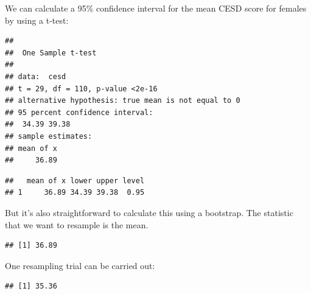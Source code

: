 We can calculate a 95\% confidence interval for the mean CESD 
score for females by using a t-test:
\begin{knitrout}
\color{fgcolor}\begin{kframe}
\begin{alltt}
\hlstd{(}\hlopt{~}  
\end{alltt}
\begin{verbatim}
## 
## 	One Sample t-test
## 
## data:  cesd
## t = 29, df = 110, p-value <2e-16
## alternative hypothesis: true mean is not equal to 0
## 95 percent confidence interval:
##  34.39 39.38
## sample estimates:
## mean of x 
##     36.89
\end{verbatim}
\begin{alltt}
\hlstd{(}\hlstd{(}\hlopt{~}  
\end{alltt}
\begin{verbatim}
##   mean of x lower upper level
## 1     36.89 34.39 39.38  0.95
\end{verbatim}
\end{kframe}
\end{knitrout}

%
%
But it's also straightforward to calculate this using a bootstrap.
The statistic that we want to resample is the mean.  
\begin{knitrout}
\color{fgcolor}\begin{kframe}
\begin{alltt}
\hlstd{(}\hlopt{~}  
\end{alltt}
\begin{verbatim}
## [1] 36.89
\end{verbatim}
\end{kframe}
\end{knitrout}

One resampling trial can be carried out:
%
\begin{knitrout}
\color{fgcolor}\begin{kframe}
\begin{alltt}
\hlstd{(}\hlopt{~}  \hlstd{=}
\end{alltt}
\begin{verbatim}
## [1] 35.36
\end{verbatim}
\end{kframe}
\end{knitrout}

